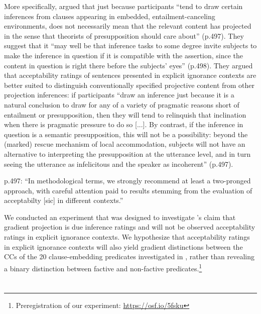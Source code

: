 \documentclass[11pt,fleqn]{article}
\newcommand{\6}{\mbox{$[\hspace*{-.6mm}[$}}
\newcommand{\9}{\mbox{$]\hspace*{-.6mm}]$}}
\newcommand{\citepos}[1]{\citeauthor{#1}'s \citeyear{#1}}
\begin{document}
More specifically, \citealt{mandelkern-etal2020} argued that just because participants ``tend to draw certain inferences from clauses appearing in embedded, entailment-canceling environments, does not necessarily mean that the relevant content has projected in the sense that theorists of presupposition should care about'' (p.497). They suggest that it ``may well be that inference tasks to some degree invite subjects to make the inference in question if it is compatible with the assertion, since the content in question is right there before the subjects' eyes'' (p.498). They argued that acceptability ratings of sentences presented in explicit ignorance contexts are better suited to distinguish conventionally specified projective content from other projection inferences: if participants ``draw an inference just because it is a natural conclusion to draw for any of a variety of pragmatic reasons short of entailment or presupposition, then they will tend to relinquish that inclination when there is pragmatic pressure to do so [...]. By contrast, if the inference in question is a semantic presupposition, this will not be a possibility: beyond the (marked) rescue mechanism of local accommodation, subjects will not have an alternative to interpreting the presupposition at the utterance level, and in turn seeing the utterance as infelicitous and the speaker as incoherent'' (p.497).

p.497: ``In methodological terms, we strongly recommend at least a two-pronged approach, with careful attention paid to results stemming from the evaluation of acceptabilty [sic] in different contexts.''

We conducted an experiment that was designed to investigate \citepos{mandelkern-etal2020} claim that gradient projection is due inference ratings and will not be observed acceptability ratings in explicit ignorance contexts. We hypothesize that acceptability ratings in explicit ignorance contexts will also yield gradient distinctions between the CCs of the 20 clause-embedding predicates investigated in \citealt{degen-tonhauser-openmind,degen-tonhauser-language}, rather than revealing a binary distinction between factive and non-factive predicates.\footnote{Preregistration of our experiment: \url{https://osf.io/5fsku}}

\section{\citealt{mandelkern-etal2020}}
\end{document}
